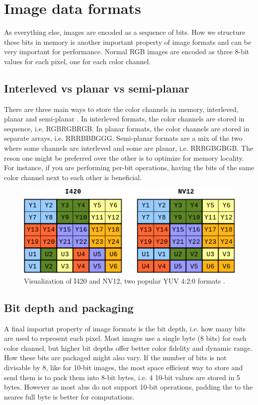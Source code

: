 \section{Image data formats}
As everything else, images are encoded as a sequence of bits.
How we structure these bits in memory is another important property of image formats and can be very important for performance.
Normal RGB images are encoded as three 8-bit values for each pixel, one for each color channel.


\subsection{Interleved vs planar vs semi-planar}
There are three main ways to store the color channels in memory, interleved, planar and semi-planar \cite{baranYUVFormats2018}.
In interleved formats, the color channels are stored in sequence, i.e. RGBRGBRGB.
In planar formats, the color channels are stored in separate arrays, i.e. RRRBBBGGG.
Semi-planar formats are a mix of the two where some channels are interleved and some are planar, i.e. RRRGBGBGB.
The reson one might be preferred over the other is to optimize for memory locality.
For instance, if you are performing per-bit operations, having the bits of the same color channel next to each other is beneficial.


\begin{figure}[H]
    \centering
    \includegraphics[width=.8\textwidth]{figures/debayer/YUV_packaging.png}
    \caption{Visualization of I420 and NV12, two popular YUV 4:2:0 formats \cite{baranYUVFormats2018}.}
    \label{fig:image_packaging}
\end{figure}

\subsection{Bit depth and packaging}
A final importnt property of image formats is the bit depth, i.e. how many bits are used to represent each pixel.
Most images use a single byte (8 bits) for each color channel, but higher bit depths offer better color fidelity and dynamic range.
How these bits are packaged might also vary.
If the number of bits is not divisable by 8, like for 10-bit images, the most space efficient way to store and send them is to pack them into 8-bit bytes, i.e. 4 10-bit values are stored in 5 bytes.
However as most \glspl{alu} do not support 10-bit operations, padding the to the neares full byte is better for computations.

